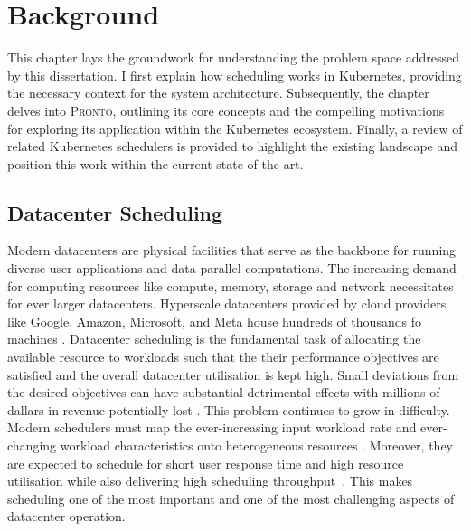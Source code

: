 \chapter{Background}

%
%
This chapter lays the groundwork for understanding the problem space addressed
by this dissertation. I first explain how scheduling works in Kubernetes,
providing the necessary context for the system architecture. Subsequently, the
chapter delves into \textsc{Pronto}, outlining its core concepts and the
compelling motivations for exploring its application within the Kubernetes
ecosystem. Finally, a review of related Kubernetes schedulers is provided to
highlight the existing landscape and position this work within the current state
of the art.

\section{Datacenter Scheduling}
Modern datacenters are physical facilities that serve as the backbone for
running diverse user applications and data-parallel computations. The increasing
demand for computing resources like compute, memory, storage and network
necessitates for ever larger datacenters. Hyperscale datacenters provided by
cloud providers like Google, Amazon, Microsoft, and Meta house hundreds of
thousands fo machines \cite{27, 107}. Datacenter scheduling is the fundamental
task of allocating the available resource to workloads such that the their
performance objectives are satisfied and the overall datacenter utilisation is
kept high. Small deviations from the desired objectives can have substantial
detrimental effects with millions of dallars in revenue potentially lost
\cite{pronto}. This problem continues to grow in difficulty. Modern
schedulers must map the ever-increasing input workload rate and ever-changing
workload characteristics onto heterogeneous resources \cite{36, 115}. Moreover,
they are expected to schedule for short user response time and high resource
utilisation while also delivering high scheduling
throughput~\cite{27,36,90,107,115}. This makes scheduling one of the most
important and one of the most challenging aspects of datacenter operation.

